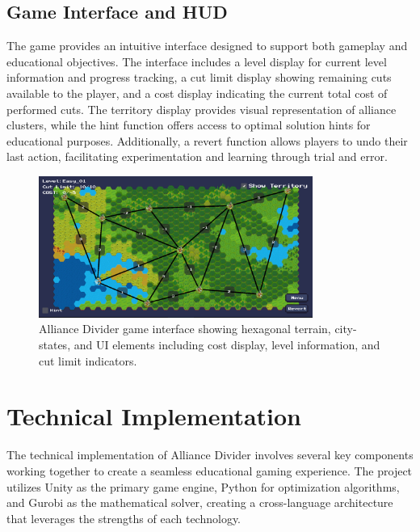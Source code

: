 \documentclass[english]{tudscrreprt}
\begin{document}
\subsection{Game Interface and HUD}
The game provides an intuitive interface designed to support both gameplay and educational objectives. The interface includes a level display for current level information and progress tracking, a cut limit display showing remaining cuts available to the player, and a cost display indicating the current total cost of performed cuts. The territory display provides visual representation of alliance clusters, while the hint function offers access to optimal solution hints for educational purposes. Additionally, a revert function allows players to undo their last action, facilitating experimentation and learning through trial and error.

\begin{figure}[h]
\centering
\includegraphics[width=0.8\textwidth]{figures/game_interface.png.png}
\caption{Alliance Divider game interface showing hexagonal terrain, city-states, and UI elements including cost display, level information, and cut limit indicators.}
\label{fig:game_interface}
\end{figure}

\section{Technical Implementation}

The technical implementation of Alliance Divider involves several key components working together to create a seamless educational gaming experience. The project utilizes Unity as the primary game engine, Python for optimization algorithms, and Gurobi as the mathematical solver, creating a cross-language architecture that leverages the strengths of each technology.
\end{document}
